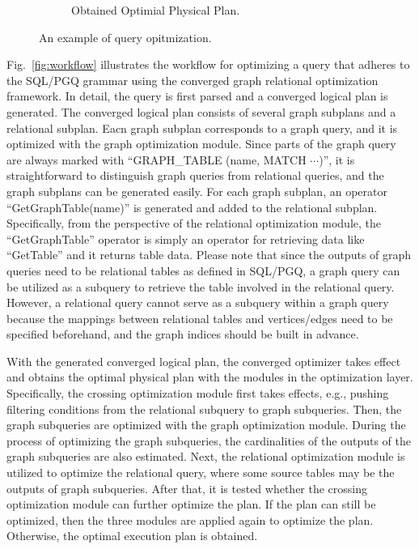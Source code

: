 \begin{figure}
\begin{subfigure}[b]{0.4\linewidth}
        \caption{Obtained Optimial Physical Plan.}
        \label{fig:physical-plan-optimized}
    \end{subfigure}
    \caption{An example of query opitmization.}
    \label{fig:query-grtree-example}
\end{figure}


Fig.~\ref{fig:workflow} illustrates the workflow for optimizing a query that adheres to the SQL/PGQ grammar using the converged graph relational optimization framework.
In detail, the query is first parsed and a converged logical plan is generated.
The converged logical plan consists of several graph subplans and a relational subplan.
Eacn graph subplan corresponds to a graph query, and it is optimized with the graph optimization module.
Since parts of the graph query are always marked with ``GRAPH\_TABLE (name, MATCH $\cdots$)'', it is straightforward to distinguish graph queries from relational queries, and the graph subplans can be generated easily.
For each graph subplan, an operator ``GetGraphTable(name)'' is generated and added to the relational subplan.
Specifically, from the perspective of the relational optimization module, the ``GetGraphTable'' operator is simply an operator for retrieving data like ``GetTable'' and it returns table data.
Please note that since the outputs of graph queries need to be relational tables as defined in SQL/PGQ, a graph query can be utilized as a subquery to retrieve the table involved in the relational query.
However, a relational query cannot serve as a subquery within a graph query because the mappings between relational tables and vertices/edges need to be specified beforehand, and the graph indices should be built in advance.


With the generated converged logical plan, the converged optimizer takes effect and obtains the optimal physical plan with the modules in the optimization layer.
Specifically, the crossing optimization module first takes effects, e.g., pushing filtering conditions from the relational subquery to graph subqueries.
Then, the graph subqueries are optimized with the graph optimization module.
During the process of optimizing the graph subqueries, the cardinalities of the outputs of the graph subqueries are also estimated.
Next, the relational optimization module is utilized to optimize the relational query, where some source tables may be the outputs of graph subqueries.
After that, it is tested whether the crossing optimization module can further optimize the plan.
If the plan can still be optimized, then the three modules are applied again to optimize the plan.
Otherwise, the optimal execution plan is obtained.

